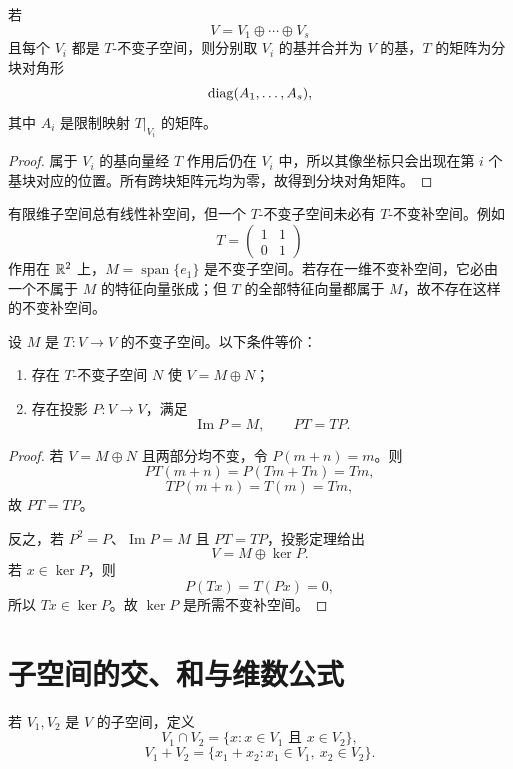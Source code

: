 \begin{theorem}[不变直和与分块对角矩阵]
若
\[
V=V_1\oplus\cdots\oplus V_s
\]
且每个 $V_i$ 都是 $T$-不变子空间，则分别取 $V_i$ 的基并合并为 $V$ 的基，$T$ 的矩阵为分块对角形
\[
\operatorname{diag}(A_1,\ldots,A_s),
\]
其中 $A_i$ 是限制映射 $T|_{V_i}$ 的矩阵。
\end{theorem}
\begin{proof}
属于 $V_i$ 的基向量经 $T$ 作用后仍在 $V_i$ 中，所以其像坐标只会出现在第 $i$ 个基块对应的位置。所有跨块矩阵元均为零，故得到分块对角矩阵。
\end{proof}

\begin{pitfall}[不变子空间未必存在不变补空间]
有限维子空间总有线性补空间，但一个 $T$-不变子空间未必有 $T$-不变补空间。例如
\[
T=\begin{pmatrix}1&1\\0&1\end{pmatrix}
\]
作用在 $\mathbb{R}^2$ 上，$M=\operatorname{span}\{e_1\}$ 是不变子空间。若存在一维不变补空间，它必由一个不属于 $M$ 的特征向量张成；但 $T$ 的全部特征向量都属于 $M$，故不存在这样的不变补空间。
\end{pitfall}

\begin{theorem}[不变补空间与交换投影]
设 $M$ 是 $T:V\to V$ 的不变子空间。以下条件等价：
\begin{enumerate}
\item 存在 $T$-不变子空间 $N$ 使 $V=M\oplus N$；
\item 存在投影 $P:V\to V$，满足
\[
\operatorname{Im}P=M,\qquad PT=TP.
\]
\end{enumerate}
\end{theorem}
\begin{proof}
若 $V=M\oplus N$ 且两部分均不变，令 $P(m+n)=m$。则
\[
PT(m+n)=P(Tm+Tn)=Tm,
\]
\[
TP(m+n)=T(m)=Tm,
\]
故 $PT=TP$。

反之，若 $P^2=P$、$\operatorname{Im}P=M$ 且 $PT=TP$，投影定理给出
\[
V=M\oplus\ker P.
\]
若 $x\in\ker P$，则
\[
P(Tx)=T(Px)=0,
\]
所以 $Tx\in\ker P$。故 $\ker P$ 是所需不变补空间。
\end{proof}

\section{子空间的交、和与维数公式}

\begin{definition}[子空间的交与和]
若 $V_1,V_2$ 是 $V$ 的子空间，定义
\[
V_1\cap V_2=\{x:x\in V_1\text{ 且 }x\in V_2\},
\]
\[
V_1+V_2=\{x_1+x_2:x_1\in V_1,\ x_2\in V_2\}.
\]
\end{definition}

